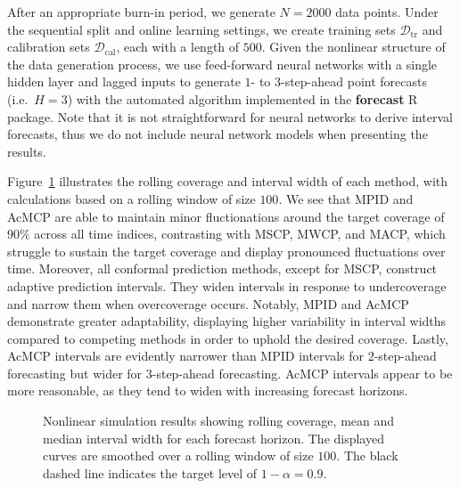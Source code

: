 \documentclass[
  11pt,
  a4paper,
]{article}
\theoremstyle{plain}
\theoremstyle{plain}
\theoremstyle{remark}
\begin{document}
After an appropriate burn-in period, we generate \(N=2000\) data points.
Under the sequential split and online learning settings, we create
training sets \(\mathcal{D}_{\text{tr}}\) and calibration sets
\(\mathcal{D}_{\text{cal}}\), each with a length of \(500\). Given the
nonlinear structure of the data generation process, we use feed-forward
neural networks with a single hidden layer and lagged inputs to generate
\(1\)- to \(3\)-step-ahead point forecasts (i.e.~\(H=3\)) with the
automated algorithm implemented in the \textbf{forecast} R package. Note
that it is not straightforward for neural networks to derive interval
forecasts, thus we do not include neural network models when presenting
the results.

Figure~\ref{fig-NL_cov} illustrates the rolling coverage and interval
width of each method, with calculations based on a rolling window of
size \(100\). We see that MPID and AcMCP are able to maintain minor
fluctionations around the target coverage of \(90\%\) across all time
indices, contrasting with MSCP, MWCP, and MACP, which struggle to
sustain the target coverage and display pronounced fluctuations over
time. Moreover, all conformal prediction methods, except for MSCP,
construct adaptive prediction intervals. They widen intervals in
response to undercoverage and narrow them when overcoverage occurs.
Notably, MPID and AcMCP demonstrate greater adaptability, displaying
higher variability in interval widths compared to competing methods in
order to uphold the desired coverage. Lastly, AcMCP intervals are
evidently narrower than MPID intervals for \(2\)-step-ahead forecasting
but wider for \(3\)-step-ahead forecasting. AcMCP intervals appear to be
more reasonable, as they tend to widen with increasing forecast
horizons.

\begin{figure}


\caption{\label{fig-NL_cov}Nonlinear simulation results showing rolling
coverage, mean and median interval width for each forecast horizon. The
displayed curves are smoothed over a rolling window of size \(100\). The
black dashed line indicates the target level of \(1-\alpha=0.9\).}

\end{figure}%
\end{document}
